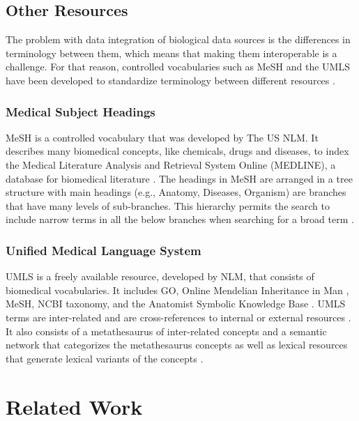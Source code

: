 \subsection{Other Resources}

The problem with data integration of biological data sources is the differences in terminology between them, which means that making them interoperable is a challenge.
For that reason, controlled vocabularies such as \ac{MeSH} and the \ac{UMLS} have been developed to standardize terminology between different resources \cite{bodenreider_unified_2004}.

\subsubsection{Medical Subject Headings}

\ac{MeSH} is a controlled vocabulary that was developed by The US \ac{NLM}.
It describes many biomedical concepts, like chemicals, drugs and diseases, to index the Medical Literature Analysis and Retrieval System Online (MEDLINE), a database for biomedical literature \cite{huang_recommending_2011}.
The headings in \ac{MeSH} are arranged in a tree structure with main headings (e.g., Anatomy, Diseases, Organism) are branches that have many levels of sub-branches.
This hierarchy permits the search to include narrow terms in all the below branches when searching for a broad term \cite{noauthor_introduction_nodate}.

\subsubsection{Unified Medical Language System}

\ac{UMLS} is a freely available resource, developed by \ac{NLM}, that consists of biomedical vocabularies.
It includes \ac{GO}, Online Mendelian Inheritance in Man \cite{amberger_omim.org:_2015}, \ac{MeSH}, \ac{NCBI} taxonomy, and the Anatomist Symbolic Knowledge Base \cite{rosse_motivation_1998}.
\ac{UMLS} terms are inter-related and are cross-references to internal or external resources \cite{bodenreider_unified_2004}.
It also consists of a metathesaurus of inter-related concepts and a semantic network that categorizes the metathesaurus concepts as well as lexical resources that generate lexical variants of the concepts \cite{bodenreider_unified_2004}.

\section{Related Work}


